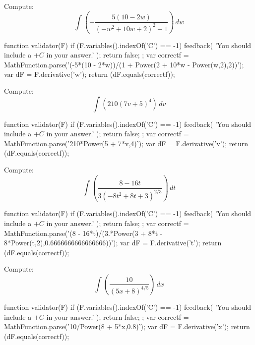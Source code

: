 \documentclass{ximera}
\renewcommand{\d}{\, d}
\begin{document}
\begin{exercise}
Compute: 
\[
\int \left(-\frac{5 (10-2 w)}{\left(-w^2+10 w+2\right)^2+1}\right)\d w
\]
\begin{expressionAnswer}
     function validator(F) {
      if (F.variables().indexOf('C') == -1) {
        feedback( 'You should include a $+C$ in your answer.' );
        return false;
      };      
      var correctf = MathFunction.parse('(-5*(10 - 2*w))/(1 + Power(2 + 10*w - Power(w,2),2))');
      var dF = F.derivative('w');
      return (dF.equals(correctf));
    }
\end{expressionAnswer}
\end{exercise}



\begin{exercise}
Compute: 
\[
\int \left(210 (7 v+5)^4\right)\d v
\]
\begin{expressionAnswer}
     function validator(F) {
      if (F.variables().indexOf('C') == -1) {
        feedback( 'You should include a $+C$ in your answer.' );
        return false;
      };      
      var correctf = MathFunction.parse('210*Power(5 + 7*v,4)');
      var dF = F.derivative('v');
      return (dF.equals(correctf));
    }
\end{expressionAnswer}
\end{exercise}



\begin{exercise}
Compute: 
\[
\int \left(\frac{8-16 t}{3 \left(-8 t^2+8 t+3\right)^{2/3}}\right)\d t
\]
\begin{expressionAnswer}
     function validator(F) {
      if (F.variables().indexOf('C') == -1) {
        feedback( 'You should include a $+C$ in your answer.' );
        return false;
      };      
      var correctf = MathFunction.parse('(8 - 16*t)/(3.*Power(3 + 8*t - 8*Power(t,2),0.6666666666666666))');
      var dF = F.derivative('t');
      return (dF.equals(correctf));
    }
\end{expressionAnswer}
\end{exercise}



\begin{exercise}
Compute: 
\[
\int \left(\frac{10}{(5 x+8)^{4/5}}\right)\d x
\]
\begin{expressionAnswer}
     function validator(F) {
      if (F.variables().indexOf('C') == -1) {
        feedback( 'You should include a $+C$ in your answer.' );
        return false;
      };      
      var correctf = MathFunction.parse('10/Power(8 + 5*x,0.8)');
      var dF = F.derivative('x');
      return (dF.equals(correctf));
    }
\end{expressionAnswer}
\end{exercise}
\end{document}
